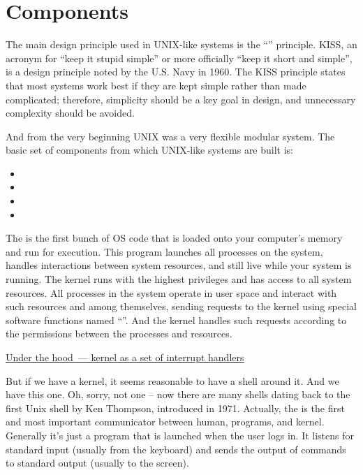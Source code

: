 \section*{Components}

The main design principle used in UNIX-like systems is the ``''
principle. KISS, an acronym for ``keep it stupid simple'' or more officially
``keep it short and simple'', is a design principle noted by the U.S. Navy
in 1960. The KISS principle states that most systems work best if they are kept
simple rather than made complicated; therefore, simplicity should be a key goal
in design, and unnecessary complexity should be avoided.

And from the very beginning UNIX was a very flexible modular system.
The basic set of components from which UNIX-like systems are built is:
\begin{itemize}
\item {}
\item {}
\item {}
\item {}
\end{itemize}

The  is the first bunch of OS code that is loaded onto your
computer's memory and run for execution. This program launches all
processes on the system, handles interactions between system resources,
and still live while your system is running. The kernel runs with
the highest privileges and has access to all system resources. All processes
in the system operate in user space and interact with such resources and
among themselves, sending requests to the kernel using special software
functions named ``''. And the kernel handles such requests
according to the permissions between the processes and resources.

\href{under_the_hood/interrupts.md}%
{Under the hood~--- kernel as a set of interrupt handlers}

But if we have a kernel, it seems reasonable to have a shell around it.
And we have this one. Oh, sorry, not one -- now there are many shells
dating back to the first Unix shell by Ken Thompson, introduced in 1971.
Actually, the  is the first and most important communicator between
human, programs, and kernel. Generally it's just a program that is
launched when the user logs in. It listens for standard input (usually
from the keyboard) and sends the output of commands to standard output
(usually to the screen).

